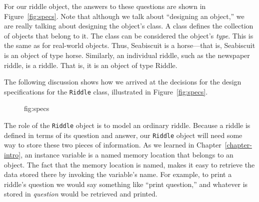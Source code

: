 For our riddle object, the answers to these questions are 
shown in Figure~\ref{fig:specs}. Note that although we talk about
``designing an object,'' we are really talking about designing the
object's class. A class defines the collection of objects that belong
to it. The class can be considered the object's {\em type}. This is
the same as for real-world objects. Thus, Seabiscuit is a horse---that
is, Seabiscuit is an object of type horse.  Similarly, an individual
riddle, such as the newspaper riddle, is a riddle.  That is, it is an
object of type Riddle.

The following discussion shows how we arrived at the decisions for the
design specifications for the {\tt Riddle} class, illustrated in
Figure~\ref{fig:specs}.

\begin{figure}[h]
{fig:specs}
\end{figure}

The role of the {\tt Riddle} object is to model an ordinary
riddle. Because a riddle is defined in terms of its question and
answer, our {\tt Riddle} object will need some way to store these two
pieces of information. As we learned in Chapter~\ref{chapter-intro}, an instance
variable is a named memory location that belongs to an object. The
fact that the memory location is named, makes it easy to retrieve the
data stored there by invoking the variable's name. For example, to
print a riddle's question we would say something like ``print
question,'' and whatever is stored in {\em question} would be
retrieved and printed.


